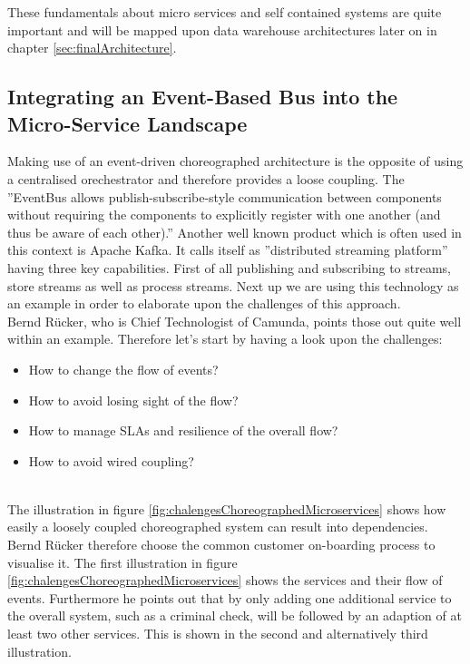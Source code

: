 These fundamentals about micro services and self contained systems are quite important and will be mapped upon data warehouse architectures later on in chapter \ref{sec:finalArchitecture}.

\subsection{Integrating an Event-Based Bus into the Micro-Service Landscape}
\label{sec:eventBasedArchitecture}
Making use of an event-driven choreographed architecture is the opposite of using a centralised orechestrator and therefore provides a loose coupling. The ''EventBus allows publish-subscribe-style communication between components without requiring the components to explicitly register with one another (and thus be aware of each other).'' \cite{EventBusExplained} \newline
Another well known product which is often used in this context is Apache Kafka. It calls itself as ''distributed streaming platform'' having three key capabilities. First of all publishing and subscribing to streams, store streams as well as process streams.\cite{kafka}
Next up we are using this technology as an example in order to elaborate upon the challenges of this approach.\newline
\\
Bernd Rücker, who is Chief Technologist of Camunda, points those out quite well within an example. Therefore let's start by having a look upon the challenges:
\begin{itemize}
    \item How to change the flow of events?
    \item How to avoid losing sight of the flow?
    \item How to manage SLAs and resilience of the overall flow?
    \item How to avoid wired coupling?
\end{itemize}
\cite{eventDrivenMicroservices}\newline
\\
The illustration in figure \ref{fig:chalengesChoreographedMicroservices} shows how easily a loosely coupled choreographed system can result into dependencies. Bernd Rücker therefore choose the common customer on-boarding process to visualise it. The first illustration in figure \ref{fig:chalengesChoreographedMicroservices} shows the services and their flow of events. Furthermore he points out that by only adding one additional service to the overall system, such as a criminal check, will be followed by an adaption of at least two other services. This is shown in the second and alternatively third illustration.\cite{eventDrivenMicroservices}\newline
